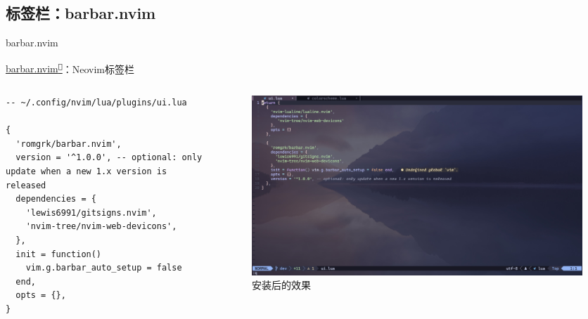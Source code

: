 \documentclass[aspectratio=169]{ctexbeamer}
\newcommand{\nerd}[1]{\texttt{#1}}
\newcommand{\link}[3][]{\href{#3}{#2\textsuperscript{\nerd{}}}}
\begin{document}
  \subsection{标签栏：barbar.nvim}
    \begin{frame}[fragile]{barbar.nvim}

      \link{barbar.nvim}{https://github.com/romgrk/barbar.nvim}：Neovim标签栏

      \begin{columns}
        \begin{column}{0.4\linewidth}
          \begin{lstlisting}[basicstyle=\tiny\ttfamily]
-- ~/.config/nvim/lua/plugins/ui.lua

{
  'romgrk/barbar.nvim',
  version = '^1.0.0', -- optional: only update when a new 1.x version is released
  dependencies = {
    'lewis6991/gitsigns.nvim',
    'nvim-tree/nvim-web-devicons',
  },
  init = function()
    vim.g.barbar_auto_setup = false
  end,
  opts = {},
}
          \end{lstlisting}
        \end{column}

        \begin{column}{0.6\linewidth}

          \begin{figure}[H]
            \centering
            \includegraphics[width=\linewidth]{./Figures/Barbar_Finish.jpg}
            \caption{安装后的效果}%
          \end{figure}

        \end{column}
      \end{columns}

    \end{frame}
\end{document}
